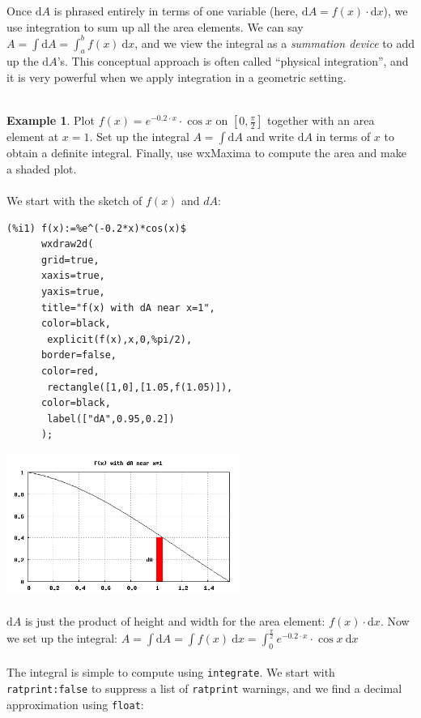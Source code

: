 \documentclass[10.5pt,twoside]{report}
\theoremstyle{definition}
\newtheorem{exmp}{Example}[section]
\begin{document}
Once  $\mathrm{d}A$ is phrased entirely in terms of one variable (here, $\mathrm{d}A=f(x)\cdot \mathrm{d}x$), we use integration to sum up all the area elements.  We can say $A=\displaystyle \int \mathrm{d}A = \displaystyle \int_{a}^{b} f(x) \ \mathrm{d}x$, and we view the integral as a \textit{summation device} to add up the $\mathrm{d}A$'s.  This conceptual approach is often called ``physical integration'', and it is very powerful when we apply integration in a geometric setting.\\
${}$\\

\begin{exmp}  Plot $f(x)=e^{-0.2\cdot x}\cdot \cos{x}$ on $[0,\frac{\pi}{2}]$ together with an area element at $x=1$.  Set up the integral $A= \displaystyle \int \mathrm{d}A$ and write $\mathrm{d} A$ in terms of $x$ to obtain a definite integral.  Finally, use wxMaxima to compute the area and make a shaded plot.\\
${}$\\

We start with the sketch of $f(x)$ and $dA$:

\begin{verbatim}
(%i1) f(x):=%e^(-0.2*x)*cos(x)$
      wxdraw2d(
      grid=true,
      xaxis=true,
      yaxis=true,
      title="f(x) with dA near x=1",
      color=black,
       explicit(f(x),x,0,%pi/2),
      border=false,
      color=red,
       rectangle([1,0],[1.05,f(1.05)]),
      color=black,
       label(["dA",0.95,0.2])
      );
\end{verbatim}

\includegraphics[width=3in]{example_3_1_1_1}
${}$\\
${}$\\
$\mathrm{d}A$ is just the product of height and width for the area element:  $f(x)\cdot \mathrm{d}x$.  Now we set up the integral:  $A = \displaystyle \int \mathrm{d}A = \displaystyle \int f(x)\ \mathrm{d}x = \displaystyle \int_0^{\frac{\pi}{2}} e^{-0.2\cdot x}\cdot \cos{x}\ \mathrm{d}x$\\
${}$\\
The integral is simple to compute using \verb|integrate|.  We start with \verb|ratprint:false| to suppress a list of \verb|ratprint| warnings, and we find a decimal approximation using \verb|float|:


\end{exmp}
\end{document}
